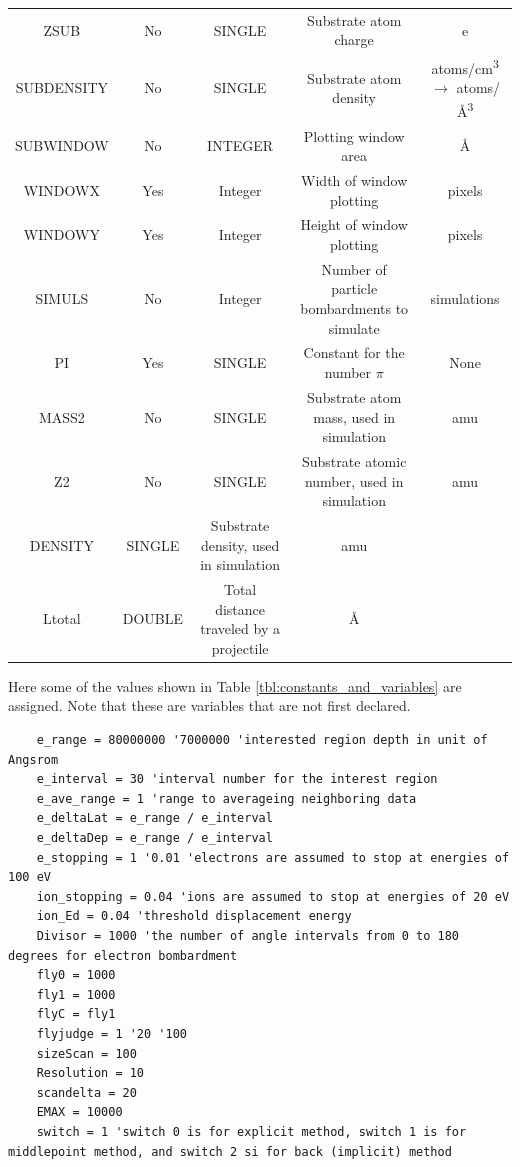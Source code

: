 \documentclass[10pt, reqno]{exam}
\begin{document}
{\begin{longtable}{|c|c|c|c|c|}
        ZSUB & No & SINGLE & Substrate atom charge & e \\
        SUBDENSITY & No & SINGLE & Substrate atom density & \si{atoms/cm^3} $\rightarrow$ \si{atoms/\angstrom^3} \\
        SUBWINDOW & No & INTEGER & Plotting window area & \si{\angstrom} \\
        WINDOWX & Yes & Integer & Width of window plotting & pixels \\
        WINDOWY & Yes & Integer & Height of window plotting & pixels \\
        SIMULS & No & Integer & Number of particle bombardments to simulate & simulations \\
        PI & Yes & SINGLE & Constant for the number $\pi$ & None \\
        \hline
        MASS2 & No & SINGLE & Substrate atom mass, used in simulation & amu \\
        Z2 & No & SINGLE & Substrate atomic number, used in simulation & amu \\
        DENSITY & SINGLE & Substrate density, used in simulation & amu \\
        Ltotal & DOUBLE & Total distance traveled by a projectile & \si{\angstrom} \\
        \hline
    \end{longtable}
}
\pagebreak
Here some of the values shown in Table \ref{tbl:constants_and_variables} are assigned. Note that these are variables that are not first declared.
\begin{verbatim}
    e_range = 80000000 '7000000 'interested region depth in unit of Angsrom
    e_interval = 30 'interval number for the interest region
    e_ave_range = 1 'range to averageing neighboring data
    e_deltaLat = e_range / e_interval
    e_deltaDep = e_range / e_interval
    e_stopping = 1 '0.01 'electrons are assumed to stop at energies of 100 eV
    ion_stopping = 0.04 'ions are assumed to stop at energies of 20 eV
    ion_Ed = 0.04 'threshold displacement energy
    Divisor = 1000 'the number of angle intervals from 0 to 180 degrees for electron bombardment
    fly0 = 1000
    fly1 = 1000
    flyC = fly1
    flyjudge = 1 '20 '100
    sizeScan = 100
    Resolution = 10
    scandelta = 20
    EMAX = 10000
    switch = 1 'switch 0 is for explicit method, switch 1 is for middlepoint method, and switch 2 si for back (implicit) method
\end{verbatim}
\end{document}
